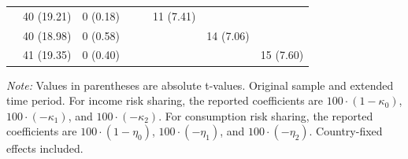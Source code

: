 \begin{table}[!htbp]
{\begin{tabular}{lccccccc}
& 40 (19.21) 
& 0 (0.18) 
& 
& 
& 11 (7.41) 
& 
& \\

& 40 (18.98) 
& 0 (0.58) 
& 
& 
& 
& 14 (7.06) 
& \\

& 41 (19.35) 
& 0 (0.40) 
& 
& 
& 
& 
& 15 (7.60) \\

\hline 
\hline
\end{tabular}%
}

\vspace{0.15cm}

\begin{minipage}{\linewidth}
\footnotesize
\textit{Note:} Values in parentheses are absolute t-values. Original sample and extended time period. For income risk sharing, the reported coefficients are \(100 \cdot (1-\kappa_0)\), \(100 \cdot (-\kappa_1)\), and \(100 \cdot (-\kappa_2)\). For consumption risk sharing, the reported coefficients are \(100 \cdot (1-\eta_0)\), \(100 \cdot (-\eta_1)\), and \(100 \cdot (-\eta_2)\). Country-fixed effects included.
\end{minipage}

\end{table}